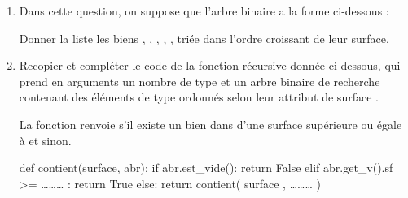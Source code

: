 \documentclass[11pt,a4paper,french,twoside]{PMCours}
\begin{document}
\begin{enumerate}
\begin{enumerate}
\item Dans cette question, on suppose que l'arbre binaire  a la forme ci-dessous :
\begin{center}
\end{center}
Donner la liste les biens , , , , ,  triée dans l'ordre croissant de leur surface.
\item Recopier et compléter le code de la fonction récursive  donnée ci-dessous, qui
prend en arguments un nombre  de type  et un arbre binaire de recherche
 contenant des éléments de type  ordonnés selon leur attribut de surface . 

La fonction  renvoie  s'il existe un bien dans  d'une surface supérieure ou égale à  et  sinon.
\begin{Python*}
def contient(surface, abr):
    if abr.est_vide():
        return False
    elif abr.get_v().sf >= ……… :
        return True 
    else:
        return contient( surface , ……… ) 
\end{Python*}
\end{enumerate}
\end{enumerate}
\end{document}
